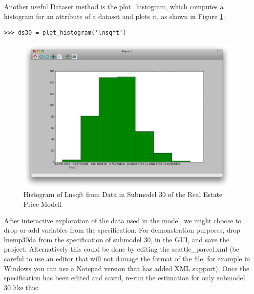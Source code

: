Another useful Dataset method is the plot\_histogram, which computes a histogram for an attribute of a dataset and plots it, as shown in Figure \ref{fig:histogram-lnsqft}:\\

\begin{lstlisting}
>>> ds30 = plot_histogram('lnsqft')
\end{lstlisting}

\begin{figure}[htp]
\begin{center}
\includegraphics[scale=0.35]{graphics/histogram-lnsqft.png}
\end{center}
\caption{Histogram of Lnsqft from Data in Submodel 30 of the Real Estate Price Modell}
\label{fig:histogram-lnsqft}
\end{figure}


After interactive exploration of the data used in the model, we might choose to drop or add variables from the specification.  For demonstration purposes, drop lnemp30da from the specification of submodel 30, in the GUI, and save the project.  Alternatively this could be done by editing the seattle\_parcel.xml (be careful to use an editor that will not damage the format of the file, for example in Windows you can use a Notepad version that has added XML support). Once the specification has been edited and saved, re-run the estimation for only submodel 30 like this:\\


